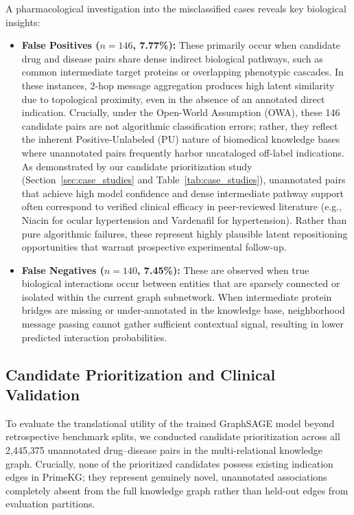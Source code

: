 \documentclass[conference,a4paper]{IEEEtran}
\begin{document}
A pharmacological investigation into the misclassified cases reveals key biological insights:
\begin{itemize}
    \item \textbf{False Positives ($n=146$, 7.77\%):} These primarily occur when candidate drug and disease pairs share dense indirect biological pathways, such as common intermediate target proteins or overlapping phenotypic cascades. In these instances, 2-hop message aggregation produces high latent similarity due to topological proximity, even in the absence of an annotated direct indication. Crucially, under the Open-World Assumption (OWA), these 146 candidate pairs are not algorithmic classification errors; rather, they reflect the inherent Positive-Unlabeled (PU) nature of biomedical knowledge bases where unannotated pairs frequently harbor uncataloged off-label indications. As demonstrated by our candidate prioritization study (Section~\ref{sec:case_studies} and Table~\ref{tab:case_studies}), unannotated pairs that achieve high model confidence and dense intermediate pathway support often correspond to verified clinical efficacy in peer-reviewed literature (e.g., Niacin for ocular hypertension and Vardenafil for hypertension). Rather than pure algorithmic failures, these represent highly plausible latent repositioning opportunities that warrant prospective experimental follow-up.
    \item \textbf{False Negatives ($n=140$, 7.45\%):} These are observed when true biological interactions occur between entities that are sparsely connected or isolated within the current graph subnetwork. When intermediate protein bridges are missing or under-annotated in the knowledge base, neighborhood message passing cannot gather sufficient contextual signal, resulting in lower predicted interaction probabilities.
\end{itemize}

\subsection{Candidate Prioritization and Clinical Validation}
To evaluate the translational utility of the trained GraphSAGE model beyond retrospective benchmark splits, we conducted candidate prioritization across all 2,445,375 unannotated drug--disease pairs in the multi-relational knowledge graph. Crucially, none of the prioritized candidates possess existing indication edges in PrimeKG; they represent genuinely novel, unannotated associations completely absent from the full knowledge graph rather than held-out edges from evaluation partitions. 
\end{document}
